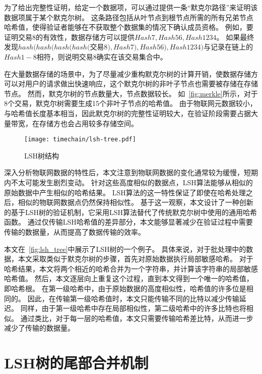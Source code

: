 为了给出完整性证明，给定一个数据项，可以通过提供一条“默克尔路径”来证明该数据项属于某个默克尔树。
这条路径包括从叶节点到根节点所需的所有兄弟节点哈希值，使得验证者能够在不获取整个数据集的情况下确认成员资格。
例如，要证明交易8的有效性，数据存储方可以提供$Hash7, Hash56, Hash1234$。
如果最终发现$hash(hash(hash(hash($交易8$),Hash7),Hash56),Hash1234)$与记录在链上的$Hash1-8$相符，则说明交易8确实在该交易集合中。

在大量数据存储的场景中，为了尽量减少重构默克尔树的计算开销，使数据存储方可以对用户的请求做出快速响应，这个默克尔树的非叶子节点也需要被存储在存储节点。
然而，默克尔树的节点数量大，节点数据较长。
如~\autoref{fig:merkle}所示，对于8个交易，默克尔树需要生成15个非叶子节点的哈希值。
由于物联网元数据较小，与哈希值长度基本相当，因此默克尔树的完整性证明较大，在验证阶段需要占据大量带宽，在存储方也会占用较多存储空间。

\begin{figure}[t]
    \centering
	\begin{minipage}{0.6\linewidth}
        \centering
        \texttt{[image: timechain/lsh-tree.pdf]}
        \caption{LSH树结构}
        \label{fig:lsh_tree}
	\end{minipage}
\end{figure}

深入分析物联网数据的特性后，本文注意到物联网数据的变化通常较为缓慢，短期内不太可能发生剧烈变动。
针对这些高度相似的数据点，LSH算法能够从相似的原始数据中产生相似的哈希结果。
LSH算法的这一特性保证了即使在哈希处理之后，相似的物联网数据点仍然保持相似性。
基于这一观察，本文设计了一种创新的基于LSH树的验证机制，它采用LSH算法替代了传统默克尔树中使用的通用哈希函数。
通过仅传输LSH哈希值的差异部分，本文能够显著减少在验证过程中需要传输的数据量，从而提高了数据传输的效率。

本文在~\autoref{fig:lsh_tree}中展示了LSH树的一个例子。
具体来说，对于批处理中的数据，本文采取类似于默克尔树的步骤，首先对原始数据执行局部敏感哈希。
对于哈希结果，本文将两个相近的哈希合并为一个字符串，并计算该字符串的局部敏感哈希值。
然后，本文逐层向上重复这个过程，直到本文得到一个唯一的哈希值，即哈希根。
在第一级哈希中，由于原始数据的高度相似性，哈希值的许多位是相同的。
因此，在传输第一级哈希值时，本文只能传输不同的比特以减少传输延迟。
同样，由于第一级哈希中存在局部相似性，第二级哈希中的许多比特也将相似。
通过类比，对于每一层的哈希值，本文只需要传输哈希差比特，从而进一步减少了传输的数据量。

\section{LSH树的尾部合并机制}

